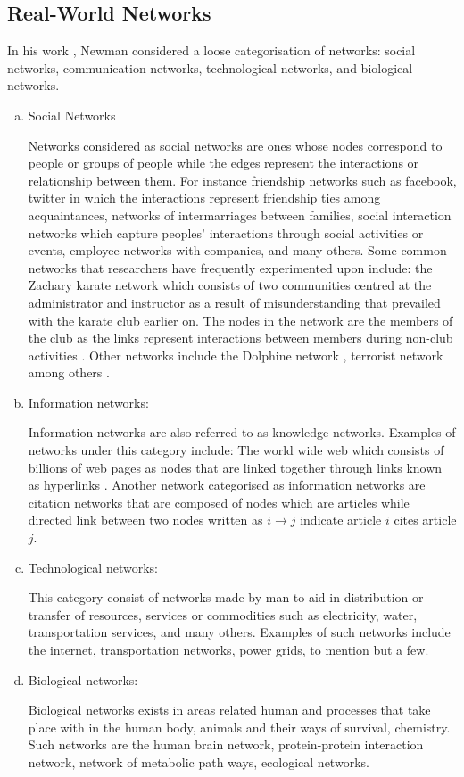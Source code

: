 \documentclass[10pt,a4paper]{article}
\begin{document}
	\subsection{Real-World Networks}
	In his work \citep{newman2003structure}, Newman considered a loose categorisation of networks: social networks, communication networks, technological networks, and biological networks.
	\begin{enumerate}[a.]
		\item Social Networks
		
		Networks considered as social networks are ones whose nodes correspond to people or groups of people while the edges represent the interactions or relationship between them. For instance friendship networks such as facebook, twitter in which the interactions represent friendship ties among acquaintances, networks of intermarriages between families, social interaction networks which capture peoples' interactions through social activities or events, employee networks with companies, and many others.
		Some common networks that researchers have frequently experimented upon include: the Zachary karate network which consists of two communities centred at the administrator and instructor as a result of misunderstanding that prevailed with the karate club earlier on. The nodes in the network are the members of the club as the links represent interactions between members during non-club activities \citep{zachary1977information}. Other networks include the Dolphine network \citep{williams1993abundance}, terrorist network\citep{magouirk2008connecting} among others .
		
		\item Information networks: 
		
		Information networks are also referred to as knowledge networks. Examples of networks under this category include: 
		The world wide web which consists of billions of web pages as nodes that are linked together through links known as hyperlinks \citep{huberman2001laws}.
		Another network categorised as information networks are citation networks that are composed of nodes which are articles while directed link between two nodes written as $i\longrightarrow j$ indicate article $i$ cites article $j$.
		\item Technological networks:
		 
		This category consist of networks made by man to aid in distribution or transfer of resources, services or commodities such as electricity, water, transportation services, and many others. Examples of such networks include the internet, transportation networks, power grids, to mention but a few.
		\item Biological networks: 
		
		Biological networks exists in areas related human and processes that take place with in the human body, animals and their ways of survival, chemistry. Such networks are the human brain network, protein-protein interaction network, network of metabolic path ways, ecological networks.
	\end{enumerate}
\end{document}
